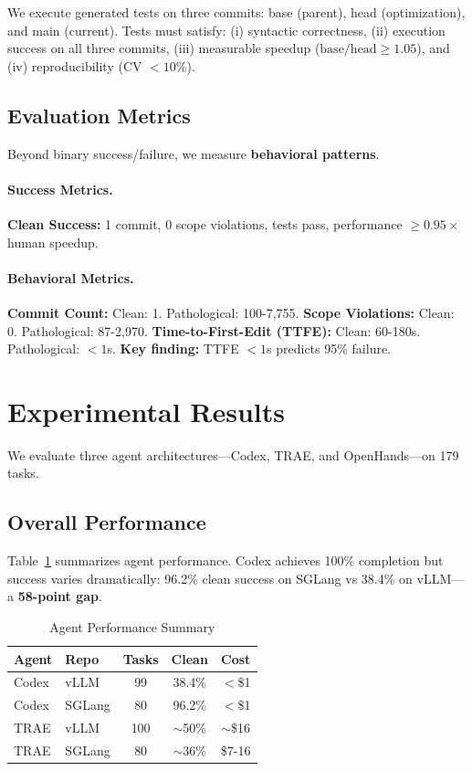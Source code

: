 \documentclass{article}
\theoremstyle{plain}
\theoremstyle{definition}
\theoremstyle{remark}
\begin{document}
We execute generated tests on three commits: base (parent), head (optimization), and main (current). Tests must satisfy: (i) syntactic correctness, (ii) execution success on all three commits, (iii) measurable speedup ($\text{base} / \text{head} \geq 1.05$), and (iv) reproducibility (CV $<10\%$).

\subsection{Evaluation Metrics}

Beyond binary success/failure, we measure \textbf{behavioral patterns}.

\paragraph{Success Metrics.}
\textbf{Clean Success:} 1 commit, 0 scope violations, tests pass, performance $\geq 0.95 \times$ human speedup.

\paragraph{Behavioral Metrics.}
\textbf{Commit Count:} Clean: 1. Pathological: 100-7,755.
\textbf{Scope Violations:} Clean: 0. Pathological: 87-2,970.
\textbf{Time-to-First-Edit (TTFE):} Clean: 60-180s. Pathological: $<1$s. \textbf{Key finding:} TTFE $<1$s predicts 95\% failure.

\section{Experimental Results}
\label{sec:results}

We evaluate three agent architectures---Codex, TRAE, and OpenHands---on 179 tasks.

\subsection{Overall Performance}

Table~\ref{tab:agent-performance} summarizes agent performance. Codex achieves 100\% completion but success varies dramatically: 96.2\% clean success on SGLang vs 38.4\% on vLLM---a \textbf{58-point gap}.

\begin{table}[t]
\caption{Agent Performance Summary}
\label{tab:agent-performance}
\centering
\small
\begin{tabular}{llccc}
\toprule
\textbf{Agent} & \textbf{Repo} & \textbf{Tasks} & \textbf{Clean} & \textbf{Cost} \\
\midrule
Codex & vLLM & 99 & 38.4\% & $<$\$1 \\
Codex & SGLang & 80 & 96.2\% & $<$\$1 \\
TRAE & vLLM & 100 & $\sim$50\% & $\sim$\$16 \\
TRAE & SGLang & 80 & $\sim$36\% & \$7-16 \\
\bottomrule
\end{tabular}
\end{table}
\end{document}
